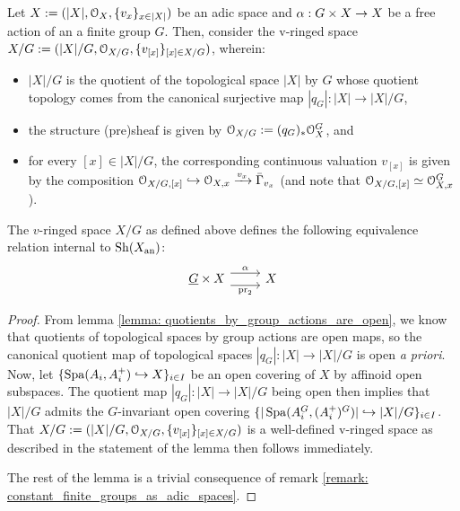             \begin{proposition} \label{prop: free_actions_of_finite_groups_induce_equivalence_relations_on_adic_spaces}
                Let $X := (|X|, \mathcal{O}_X, \{v_x\}_{x \in |X|})$ be an adic space and $\alpha: G \x X \to X$ be a free action of an a finite group $G$. Then, consider the v-ringed space $X/G := (|X|/G, \mathcal{O}_{X/G}, \{v_{[x]}\}_{[x] \in X/G})$, wherein:
                    \begin{itemize}
                        \item $|X|/G$ is the quotient of the topological space $|X|$ by $G$ whose quotient topology comes from the canonical surjective map $|q_G|: |X| \to |X|/G$, 
                        \item the structure (pre)sheaf is given by $\mathcal{O}_{X/G} := (q_G)_*\mathcal{O}_X^G$, and
                        \item for every $[x] \in |X|/G$, the corresponding continuous valuation $v_{[x]}$ is given by the composition $\mathcal{O}_{X/G, [x]} \hookrightarrow \mathcal{O}_{X, x} \xrightarrow[]{v_x} \bar{\Gamma}_{v_x}$ (and note that $\mathcal{O}_{X/G, [x]} \simeq \mathcal{O}_{X, x}^G$).
                    \end{itemize}
                The $v$-ringed space $X/G$ as defined above defines the following equivalence relation internal to $\mathrm{Sh}(X_{\mathrm{an}})$:
                    $$
                        \begin{tikzcd}
                        	{\underline{G} \x X} & X
                        	\arrow["{\pr_2}"', shift right=2, from=1-1, to=1-2]
                        	\arrow["\alpha", shift left=2, from=1-1, to=1-2]
                        \end{tikzcd}
                    $$
            \end{proposition}
                \begin{proof}
                    From lemma \ref{lemma: quotients_by_group_actions_are_open}, we know that quotients of topological spaces by group actions are open maps, so the canonical quotient map of topological spaces $|q_G|: |X| \to |X|/G$ is open \textit{a priori}. Now, let $\{\operatorname{Spa}(A_i, A_i^+) \hookrightarrow X\}_{i \in I}$ be an open covering of $X$ by affinoid open subspaces. The quotient map $|q_G|: |X| \to |X|/G$ being open then implies that $|X|/G$ admits the $G$-invariant open covering $\{|\operatorname{Spa}(A_i^G, (A_i^+)^G)| \hookrightarrow |X|/G\}_{i \in I}$. That $X/G := (|X|/G, \mathcal{O}_{X/G}, \{v_{[x]}\}_{[x] \in X/G})$ is a well-defined v-ringed space as described in the statement of the lemma then follows immediately. 
                    
                    The rest of the lemma is a trivial consequence of remark \ref{remark: constant_finite_groups_as_adic_spaces}.
                \end{proof}
